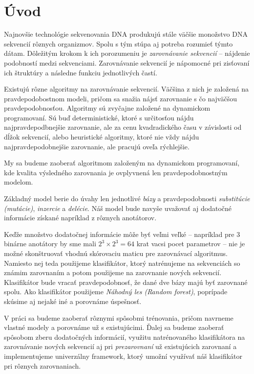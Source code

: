 \chapter*{Úvod}


Najnovšie technológie sekvenovania DNA produkujú stále väčšie monožstvo DNA sekvencií rôznych organizmov. Spolu s tým stúpa aj potreba rozumieť týmto dátam. 
Dôležitým krokom k ich porozumeniu je \textit{zarovnávanie sekvencií} -- nájdenie podobností medzi sekvenciami.
Zarovnávanie sekvencií je nápomocné pri zisťovaní ich štruktúry a následne funkciu jednotlivých častí.

Existujú rôzne algoritmy na zarovnávanie sekvencií. Väčšina z nich je založená na  pravdepodobostnom modeli, pričom sa snažia nájsť zarovnanie s čo najväčšou pravdepodobnosťou.
Algoritmy sú zvyčajne založené na dynamickom programovaní. Sú buď deterministické, ktoré s určitosťou nájdu najpravdepodbnejšie zarovnanie, ale za cenu kvadradického času v závislosti od dĺžok sekvencií, alebo heuristické algoritmy, ktoré nie vždy nájdu najpravdepodobnejšie zarovnanie, ale pracujú oveľa rýchlejšie.

My sa budeme zaoberať algoritmom založeným na dynamickom programovaní, kde kvalita výsledného zarovnania je ovplyvnená len pravdepodobnostným modelom.

Základný model berie do úvahy len jednotlivé \textit{bázy} a pravdepodobnosti \textit{substitúcie (mutácie)}, \textit{inzercie} a \textit{delécie}.
Náš model bude navyše uvažovať aj dodatočné informácie získané napríklad z rôznych anotátorov.

Keďže množstvo dodatočnej informácie môže byť veľmi veľké -- napríklad pre 3 binárne anotátory by sme mali $2^3 \times 2^3 = 64$ krat vacsi pocet parametrov --
nie je možné skonštruovať vhodnú skórovaciu maticu pre zarovnávací algoritmus.
Namiesto nej teda použijeme klasifikátor, ktorý natrénujeme na sekvenciách so známim zarovnaním a potom použijeme na zarovnanie nových sekvencií. Klasifikátor bude vracať pravdepodobnosť, že dané dve bázy majú byť zarovnané spolu. 
Ako klasifikátor použijeme \textit{Náhodný les (Random forest)}, poprípade skúsime aj nejaké iné a porovnáme úspešnosť.


V práci sa budeme zaoberať rôznymi spôsobmi trénovania, pričom navrneme vlastné modely a porovnáme už s existujúcimi. Ďalej sa budeme zaoberať spôsobom zberu dodatočných informácií, využitu natrénovaného klasifikátora na zarovnávanie nových sekvencií aj pri \textit{prezarovnaní} už existujúcich zarovnaní a implementujeme univerzálny framework, ktorý umožní využívať náš klasifikátor pri rôznych zarovnaniach.

